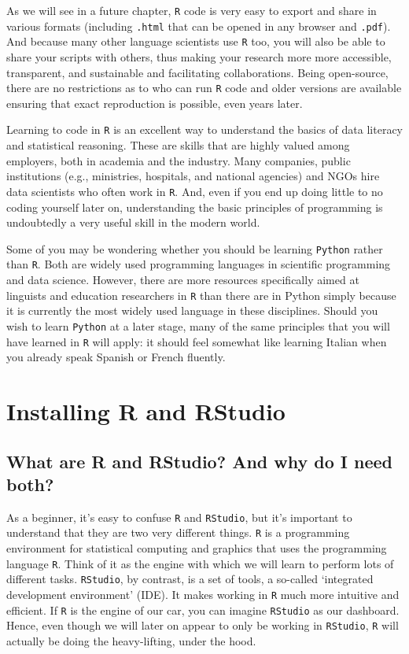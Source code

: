\documentclass[
  letterpaper,
  DIV=11,
  numbers=noendperiod]{scrreprt}
\begin{document}
As we will see in a future chapter, \texttt{R} code is very easy to
export and share in various formats (including \texttt{.html} that can
be opened in any browser and \texttt{.pdf}). And because many other
language scientists use \texttt{R} too, you will also be able to share
your scripts with others, thus making your research more more
accessible, transparent, and sustainable and facilitating
collaborations. Being open-source, there are no restrictions as to who
can run \texttt{R} code and older versions are available ensuring that
exact reproduction is possible, even years later.

Learning to code in \texttt{R} is an excellent way to understand the
basics of data literacy and statistical reasoning. These are skills that
are highly valued among employers, both in academia and the industry.
Many companies, public institutions (e.g., ministries, hospitals, and
national agencies) and NGOs hire data scientists who often work in
\texttt{R}. And, even if you end up doing little to no coding yourself
later on, understanding the basic principles of programming is
undoubtedly a very useful skill in the modern world.

Some of you may be wondering whether you should be learning
\texttt{Python} rather than \texttt{R}. Both are widely used programming
languages in scientific programming and data science. However, there are
more resources specifically aimed at linguists and education researchers
in \texttt{R} than there are in Python simply because it is currently
the most widely used language in these disciplines. Should you wish to
learn \texttt{Python} at a later stage, many of the same principles that
you will have learned in \texttt{R} will apply: it should feel somewhat
like learning Italian when you already speak Spanish or French fluently.

\section{Installing R and RStudio}\label{installing-r-and-rstudio}

\subsection{What are R and RStudio? And why do I need
both?}\label{what-are-r-and-rstudio-and-why-do-i-need-both}

As a beginner, it's easy to confuse \texttt{R} and \texttt{RStudio}, but
it's important to understand that they are two very different things.
\texttt{R} is a programming environment for statistical computing and
graphics that uses the programming language \texttt{R}. Think of it as
the engine with which we will learn to perform lots of different tasks.
\texttt{RStudio}, by contrast, is a set of tools, a so-called
`integrated development environment' (IDE). It makes working in
\texttt{R} much more intuitive and efficient. If \texttt{R} is the
engine of our car, you can imagine \texttt{RStudio} as our dashboard.
Hence, even though we will later on appear to only be working in
\texttt{RStudio}, \texttt{R} will actually be doing the heavy-lifting,
under the hood.
\end{document}
